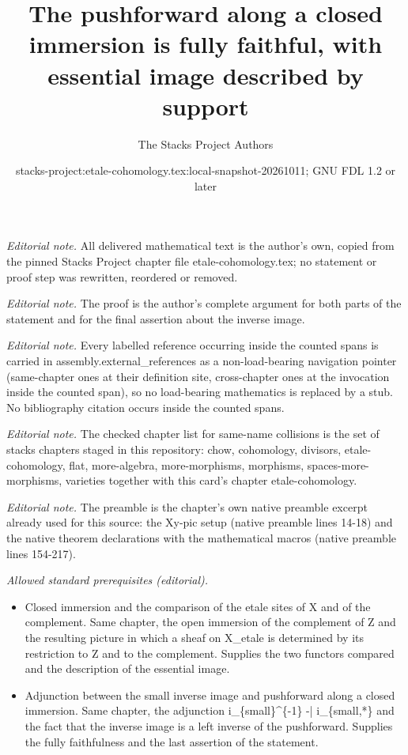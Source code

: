 \documentclass[10pt,a4paper]{amsart}
\title{The pushforward along a closed immersion is fully faithful, with essential image described by support}
\author{The Stacks Project Authors}
\date{stacks-project:etale-cohomology.tex:local-snapshot-20261011; GNU FDL 1.2 or later}
\theoremstyle{plain}
\theoremstyle{definition}
\theoremstyle{remark}
\numberwithin{equation}{subsection}
\begin{document}
\maketitle
\noindent\textit{Editorial note.} All delivered mathematical text is the author's own, copied from the pinned Stacks Project chapter file etale-cohomology.tex; no statement or proof step was rewritten, reordered or removed.\par\medskip
\noindent\textit{Editorial note.} The proof is the author's complete argument for both parts of the statement and for the final assertion about the inverse image.\par\medskip
\noindent\textit{Editorial note.} Every labelled reference occurring inside the counted spans is carried in assembly.external\_references as a non-load-bearing navigation pointer (same-chapter ones at their definition site, cross-chapter ones at the invocation inside the counted span), so no load-bearing mathematics is replaced by a stub. No bibliography citation occurs inside the counted spans.\par\medskip
\noindent\textit{Editorial note.} The checked chapter list for same-name collisions is the set of stacks chapters staged in this repository: chow, cohomology, divisors, etale-cohomology, flat, more-algebra, more-morphisms, morphisms, spaces-more-morphisms, varieties together with this card's chapter etale-cohomology.\par\medskip
\noindent\textit{Editorial note.} The preamble is the chapter's own native preamble excerpt already used for this source: the Xy-pic setup (native preamble lines 14-18) and the native theorem declarations with the mathematical macros (native preamble lines 154-217).\par\medskip
\noindent\textit{Allowed standard prerequisites (editorial).}\begin{itemize}
\item Closed immersion and the comparison of the etale sites of X and of the complement. Same chapter, the open immersion of the complement of Z and the resulting picture in which a sheaf on X\_etale is determined by its restriction to Z and to the complement. Supplies the two functors compared and the description of the essential image.
\item Adjunction between the small inverse image and pushforward along a closed immersion. Same chapter, the adjunction i\_\{small\}\textasciicircum{}\{-1\} -| i\_\{small,*\} and the fact that the inverse image is a left inverse of the pushforward. Supplies the fully faithfulness and the last assertion of the statement.
\end{itemize}\medskip
\end{document}
